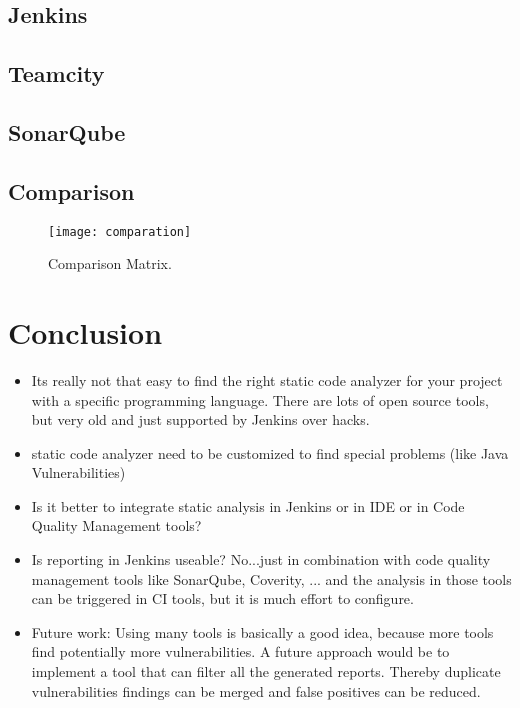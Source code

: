 \documentclass[conference]{IEEEtran}
\begin{document}
\subsection{Jenkins}
\label{subsec:evaluation_jenkins}

\subsection{Teamcity}
\label{subsec:evaluation_teamcity}

\subsection{SonarQube}
\label{subsec:evaluation_sonarqube}


\subsection{Comparison}
\label{subsec:comparation}

\begin{figure}[h]
	\texttt{[image: comparation]}
	\caption{Comparison Matrix.}
	\label{fig:comparison_matrix}
\end{figure}


\section{Conclusion}
\label{sec:conclusion}
\begin{itemize}
	\item Its really not that easy to find the right static code analyzer for your project with a specific programming language. There are lots of open source tools, but very old and just supported by Jenkins over hacks.
	\item static code analyzer need to be customized to find special problems (like Java Vulnerabilities)
	\item Is it better to integrate static analysis in Jenkins or in IDE or in Code Quality Management tools?
	\item Is reporting in Jenkins useable? No...just in combination with code quality management tools like SonarQube, Coverity, ... and the analysis in those tools can be triggered in CI tools, but it is much effort to configure.
	\item Future work: Using many tools is basically a good idea, because more tools find potentially more vulnerabilities. A future approach would be to implement a tool that can filter all the generated reports. Thereby duplicate vulnerabilities findings can be merged and false positives can be reduced.
\end{itemize}





\end{document}
